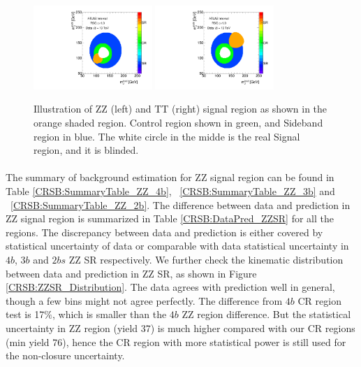 \begin{figure}[htbp!]
\begin{center}
\includegraphics[width=0.4\textwidth,angle=-90]{figures/boosted/ZZ/Compare_NoTag_mH0H1.pdf}
\includegraphics[width=0.4\textwidth,angle=-90]{figures/boosted/TT/Compare_NoTag_mH0H1.pdf}
\end{center}
\caption{Illustration of ZZ (left) and TT (right) signal region as shown in the orange shaded region. Control region shown in green, and Sideband region in blue. The white circle in the midde is the real Signal region, and it is blinded.}
\label{CRSB:ZZIllustration}
\end{figure}

\paragraph{}
The summary of background estimation for ZZ signal region can be found in Table \ref{CRSB:SummaryTable_ZZ_4b}, ~\ref{CRSB:SummaryTable_ZZ_3b} and ~\ref{CRSB:SummaryTable_ZZ_2b}. The difference between data and prediction in ZZ signal region is summarized in Table \ref{CRSB:DataPred_ZZSR} for all the regions. The discrepancy between data and prediction is either covered by statistical uncertainty of data or comparable with data statistical uncertainty in $4b$, $3b$ and $2bs$ ZZ SR respectively. We further check the kinematic distribution between data and prediction in ZZ SR, as shown in Figure \ref{CRSB:ZZSR_Distribution}. The data agrees with prediction well in general, though a few bins might not agree perfectly. The difference from $4b$ CR region test is 17$\%$, which is smaller than the $4b$ ZZ region difference. But the statistical uncertainty in ZZ region (yield 37) is much higher compared with our CR regions (min yield 76), hence the CR region with more statistical power is still used for the non-closure uncertainty.

